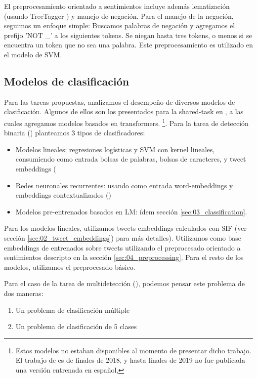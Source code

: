 El preprocesamiento orientado a sentimientos incluye además lematización (usando TreeTagger \cite{schmid95}) y manejo de negación. Para el manejo de la negación, seguimos un enfoque simple:
Buscamos palabras de negación y agregamos el prefijo 'NOT \_' a los siguientes tokens. Se niegan hasta tres tokens, o menos si se encuentra un token que no sea una palabra. Este preprocesamiento es utilizado en el modelo de SVM.

\subsection{Modelos de clasificación}
\label{sec:04_classifiers}

Para las tareas propuestas, analizamos el desempeño de diversos modelos de clasificación. Algunos de ellos son los presentados para la shared-task \hateval{} en \citet{atalaya_tass2018}, a las cuales agregamos modelos basados en transformers. \footnote{Estos modelos no estaban disponibles al momento de presentar dicho trabajo. El trabajo de \bert{} \cite{devlin2018bert} es de finales de 2018, y hasta finales de 2019 no fue publicada una versión entrenada en español, \beto{}}. Para la tarea de detección binaria (\subtaska{}) planteamos 3 tipos de clasificadores:

\begin{itemize}
    \item Modelos lineales: regresiones logísticas y SVM con kernel lineales, consumiendo como entrada bolsas de palabras, bolsas de caracteres, y tweet embeddings (
    \item Redes neuronales recurrentes: usando como entrada word-embeddings y embeddings contextualizados (\elmo{})
    \item Modelos pre-entrenados basados en LM: ídem sección \ref{sec:03_classification}.
\end{itemize}

Para los modelos lineales, utilizamos tweets embeddings calculados con SIF (ver sección \ref{sec:02_tweet_embeddings}) para más detalles). Utilizamos como base embeddings de \fasttext{} entrenados sobre tweets utilizando el preprocesado orientado a sentimientos descripto en la sección \ref{sec:04_preprocessing}. Para el resto de los modelos, utilizamos el preprocesado básico.

Para el caso de la tarea de multidetección (\subtaskb{}), podemos pensar este problema de dos maneras:

\begin{enumerate}
    \item Un problema de clasificación múltiple
    \item Un problema de clasificación de 5 clases
\end{enumerate}

